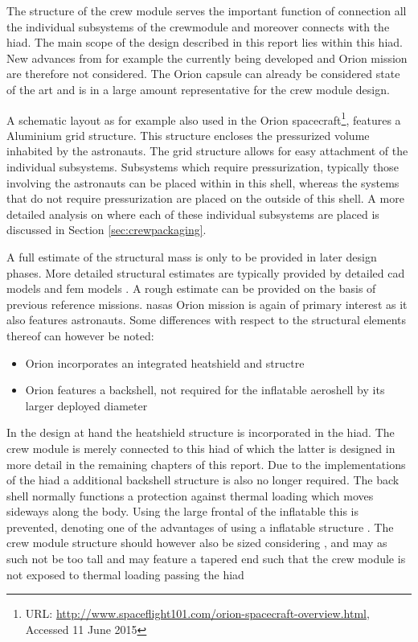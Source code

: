 The structure of the crew module serves the important function of connection all the individual subsystems of the crewmodule and moreover connects with the \gls{hiad}. The main scope of the design described in this report lies within this \gls{hiad}. New advances from for example the currently being developed and Orion mission are therefore not considered. The Orion capsule can already be considered state of the art and is in a large amount representative for the crew module design.

A schematic layout as for example also used in the Orion spacecraft\footnote{URL: \url{http://www.spaceflight101.com/orion-spacecraft-overview.html}, Accessed 11 June 2015 }, features a Aluminium grid structure. This structure encloses the pressurized volume inhabited by the astronauts. The grid structure allows for easy attachment of the individual subsystems. Subsystems which require pressurization, typically those involving the astronauts can be placed within in this shell, whereas the systems that do not require pressurization are placed on the outside of this shell. A more detailed analysis on where each of these individual subsystems are placed is discussed in Section \ref{sec:crewpackaging}.


A full estimate of the structural mass is only to be provided in later design phases. More detailed structural estimates are typically provided by detailed \gls{cad} models and \gls{fem} models \cite{Wertz2011}. A rough estimate can be provided on the basis of previous reference missions. \glspl{nasa} Orion mission is again of primary interest as it also features astronauts. Some differences with respect to the structural elements thereof can however be noted:

\begin{itemize}
\item Orion incorporates an integrated heatshield and structre
\item Orion features a backshell, not required for the inflatable aeroshell by its larger deployed diameter
\end{itemize}


In the design at hand the heatshield structure is incorporated in the \gls{hiad}. The crew module is merely connected to this \gls{hiad} of which the latter is designed in more detail in the remaining chapters of this report. Due to the implementations of the \gls{hiad} a additional backshell structure is also no longer required. The back shell normally functions a protection against thermal loading which moves sideways along the body. Using the large frontal of the inflatable this is prevented, denoting one of the advantages of using a inflatable structure \cite{Hughes2005}. The crew module structure should however also be sized considering , and may as such not be too tall and may feature a tapered end such that the crew module is not exposed to thermal loading passing the \gls{hiad}

